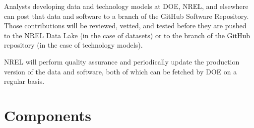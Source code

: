\documentclass[letterpaper,10pt,english]{sphinxmanual}
\begin{document}
Analysts developing data and technology models at DOE, NREL, and
elsewhere can post that data and software to a branch of the GitHub
Software Repository. Those contributions will be reviewed, vetted, and
tested before they are pushed to the NREL Data Lake (in the case of
datasets) or to the  branch of the GitHub repository (in
the case of technology models).

NREL will perform quality assurance and periodically update the
production version of the data and software, both of which can be
fetched by DOE on a regular basis.


\section{Components}
\label{\detokenize{doc-src/deployment:components}}
\end{document}

